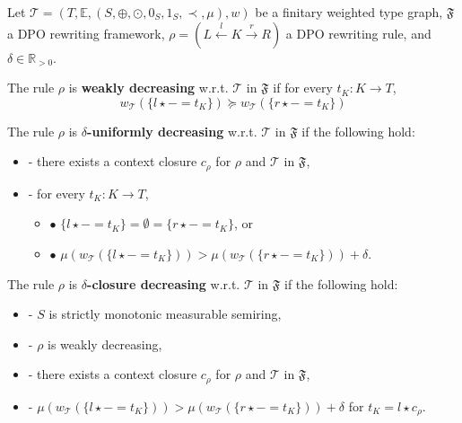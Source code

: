 \begin{definition}
    \label{def:nwf:decreasing_rule}
    Let $\mathcal{T} = (T,\mathbb{E}, (S, \oplus, \odot, 0_S, 1_S, \prec, \mu), w)$ be a finitary weighted type graph, \(\mathfrak{F}\) a DPO rewriting framework, $\rho = (L \overset{l}{\leftarrow} K \overset{r}{\rightarrow} R)$ a DPO rewriting rule, and $\delta \in \mathbb{R}_{>0}$. 

    \noindent
    The rule $\rho$ is \textbf{weakly decreasing} w.r.t. $\mathcal{T}$ in $\mathfrak{F}$ if 
            for every $t_K : K \to T$,
                $$ 
                  w_\mathcal{T}(\{l \star - = t_K\}) \succeq w_\mathcal{T}(\{r\star - = t_K\})$$
           
    \noindent
    The rule $\rho$ is \textbf{$\delta$-uniformly decreasing} w.r.t. $\mathcal{T}$ in $\mathfrak{F}$ if the following hold:
        \begin{itemize}
            \item[]- there exists a context closure $c_\rho$ for $\rho$ and $\mathcal{T}$ in $\mathfrak{F}$, 
            \item[]- for every $t_K : K \to T$,
            \begin{itemize}
                \item[] $\bullet$ $\{l \star - = t_K\} = \emptyset = \{r \star - = t_K\}$, or
                \item[] $\bullet$ $\mu(w_\mathcal{T}(\{l \star - = t_K\}))  >   \mu(w_\mathcal{T}(\{r \star - = t_K\})) + \delta$.
            \end{itemize}
        \end{itemize}  
         
    \noindent
    The rule $\rho$ is
            \textbf{$\delta$-closure decreasing} w.r.t. $\mathcal{T}$ in $\mathfrak{F}$ if the following hold:
            \begin{itemize}
                \item[]- $S$ is strictly monotonic measurable semiring,
                \item[]- $\rho$ is weakly decreasing,
                \item[]- there exists a context closure $c_\rho$ for $\rho$ and $\mathcal{T}$ in $\mathfrak{F}$,
                \item[]- $ \mu(w_\mathcal{T}(\{l \star - = t_K\}))  >  \mu(w_\mathcal{T}(\{r \star - = t_K\}))  + \delta$ for $t_K = l \star c_\rho$.
            \end{itemize}
\end{definition}

